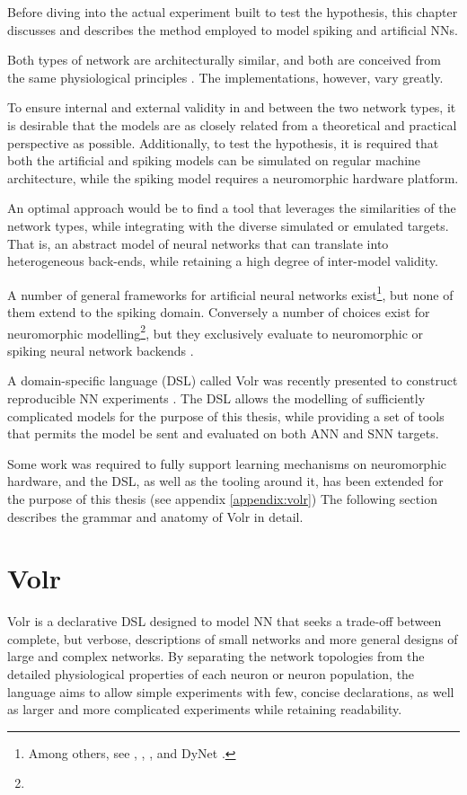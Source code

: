 \documentclass{report.tex}{subfiles}
\begin{document}
Before diving into the actual experiment built to test the hypothesis, this
chapter discusses and describes the method employed to model spiking
and artificial \gls{NN}s.

Both types of network are architecturally similar, and both are conceived from
the same physiological principles \autocite{dayan2001, russel2007, Nilsson2009, schmidhuber2014}.
The implementations, however, vary greatly.

To ensure internal and external validity in and between the two network types,
it is desirable that the models are as closely related from a theoretical and
practical perspective as possible.
Additionally, to test the hypothesis, it is required that both the artificial
and spiking models can be simulated on regular machine architecture, while
the spiking model requires a neuromorphic hardware platform.

An optimal approach would be to find a tool that leverages the similarities
of the network types, while integrating with the diverse simulated or emulated
targets.
That is, an abstract model of neural networks that can translate into
heterogeneous back-ends, while retaining a high degree of inter-model validity.

A number of general frameworks for artificial neural networks
exist\footnote{
  Among others, see \autocite{ONNX2018}, \autocite{PyTorch2018}, \autocite{TensorFlow2018},
  \autocite{Keras2018} and DyNet \autocite{Neubig2017}.
}, but none of them extend to the spiking domain.
Conversely a number of choices exist for neuromorphic modelling\footnote{
}, but they exclusively evaluate to neuromorphic or spiking neural network
backends \autocite{Jordan2018}.

A domain-specific language (DSL) called Volr was recently presented to
construct reproducible \gls{NN} experiments
\autocite{Pedersen2018:volr}.
The DSL allows the modelling of sufficiently complicated models for
the purpose of this thesis, while providing a set of tools that permits the
model be sent and evaluated on both \gls{ANN} and \gls{SNN} targets.


Some work was required to fully support learning mechanisms on
neuromorphic hardware, and the DSL, as well as the tooling around it, has been
extended for the purpose of this thesis (see appendix \ref{appendix:volr})
The following section describes the grammar and anatomy of Volr in detail.

\section{Volr}
Volr is a declarative DSL designed to model \gls{NN} that seeks a
trade-off between complete, but verbose, descriptions of small
networks and more general designs of large and complex networks.
By separating the network topologies from the detailed physiological properties
of each neuron or neuron population, the language aims to allow simple
experiments with few, concise declarations, as well as larger and more
complicated experiments while retaining readability.
\end{document}
